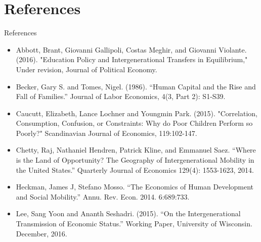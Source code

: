 \documentclass{beamer}
\begin{document}

\section{References}
\begin{frame}{References}
\begin{footnotesize}
\begin{itemize}
\item Abbott, Brant, Giovanni Gallipoli, Costas Meghir, and Giovanni Violante. (2016). "Education Policy and Intergenerational Transfers in Equilibrium," Under revision, Journal of Political Economy. 

\item Becker, Gary S. and Tomes, Nigel. (1986). ``Human Capital and the Rise and Fall of Families.'' Journal of Labor Economics, 4(3, Part 2): S1-S39.

\item Caucutt, Elizabeth, Lance Lochner and Youngmin Park. (2015). "Correlation, Consumption, Confusion, or Constraints: Why do Poor Children Perform so Poorly?" Scandinavian Journal of Economics, 119:102-147.

\item Chetty, Raj, Nathaniel Hendren, Patrick Kline, and Emmanuel Saez. ``Where is the Land of Opportunity? The Geography of Intergenerational Mobility in the United States.'' Quarterly Journal of Economics 129(4): 1553-1623, 2014.



\item Heckman, James J, Stefano Mosso. ``The Economics of Human Development and Social Mobility.'' Annu. Rev. Econ. 2014. 6:689:733.

\item  Lee, Sang Yoon and  Ananth Seshadri. (2015). ``On the Intergenerational Transmission of Economic Status.'' Working Paper, University of Wisconsin. December, 2016.


\end{itemize}
\end{footnotesize}
\end{frame}
\end{document}
